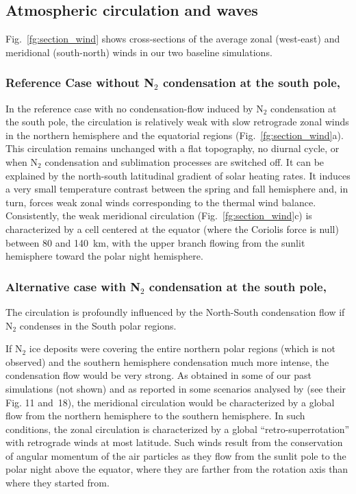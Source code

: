 \subsection{Atmospheric circulation and waves}

Fig.~\ref{fg:section_wind} shows cross-sections of the average zonal (west-east) and
meridional (south-north) winds in our two baseline simulations. 

\subsubsection{Reference Case without N$_2$ condensation at the south pole,}

In the reference case with no condensation-flow induced by N$_2$ condensation at the south pole, 
the circulation is relatively weak with slow retrograde zonal
winds in the northern hemisphere and the equatorial regions
(Fig.~\ref{fg:section_wind}a).  This circulation remains unchanged
with a flat topography, no diurnal cycle, or when N$_2$ condensation and
sublimation processes are switched off. It 
can be explained by the north-south latitudinal gradient of solar heating rates. 
It induces a very small temperature contrast between the spring and fall hemisphere and, in 
turn, forces weak zonal winds corresponding to the thermal wind balance. 
Consistently, the weak meridional
circulation (Fig.~\ref{fg:section_wind}c) is characterized by a cell 
centered at the equator (where the Coriolis force is null) 
between 80 and 140~km, with the upper branch flowing from the sunlit hemisphere toward
the polar night hemisphere. 


\subsubsection{Alternative case with N$_2$ condensation at the south pole,}

\label{fg:wind2}

The circulation is profoundly influenced by the North-South condensation flow if N$_2$
condenses in the South polar regions. 

If N$_2$ ice deposits were covering the entire northern polar regions (which is not
observed) and the southern hemisphere condensation much more intense, 
the condensation flow would be very strong. 
As obtained in some of our past simulations (not
shown) and as reported in some scenarios analysed by \cite{Toig:15} (see their Fig. 11 
and~18), the meridional
circulation would be characterized by a global flow from the northern hemisphere to the
southern hemisphere. In such conditions, the zonal circulation is characterized by a
global ``retro-superrotation'' with retrograde winds at most latitude. Such winds result
from the conservation of angular momentum of the air particles as they flow from the sunlit
pole to the polar night above the equator, where they are farther from the 
rotation axis than where they started from. 


